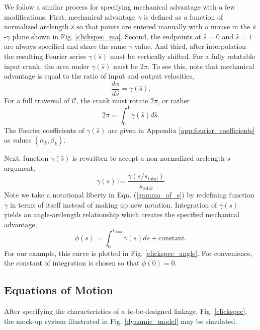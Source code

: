 \documentclass[journal]{IEEEtran}
\begin{document}
We follow a similar process for specifying mechanical advantage with a few modifications.
First, mechanical advantage $\gamma$ is defined as a function of normalized arclength $\hat{s}$ so that points are entered manually with a mouse in the $\hat{s}$-$\gamma$ plane shown in Fig. \ref{clickspec_ma}.
Second, the endpoints at $\hat{s}\!=\!0$ and $\hat{s}\!=\!1$ are always specified and share the same $\gamma$ value.
And third, after interpolation the resulting Fourier series $\gamma(\hat{s})$ must be vertically shifted.
For a fully rotatable input crank, the area under $\gamma(\hat{s})$ must be $2\pi$.
To see this, note that mechanical advantage is equal to the ratio of input and output velocities,
\begin{equation}
\frac{d\phi}{d\hat{s}} = \gamma(\hat{s}).
\end{equation}
For a full traversal of $\mathcal{C}$, the crank must rotate $2\pi$, or rather
\begin{equation}
2\pi = \int_{0}^{1} \gamma(\hat{s}) d\hat{s}.
\end{equation}
The Fourier coefficients of $\gamma(\hat{s})$ are given in Appendix \ref{app:fourier_coefficients} as values $(\alpha_k, \beta_k)$.

Next, function $\gamma(\hat{s})$ is rewritten to accept a non-normalized arclength $s$ argument,
\begin{equation}
\gamma(s) := \frac{\gamma(s/s_\text{total})}{s_\text{total}}
\label{gamma_of_s}
\end{equation}
Note we take a notational liberty in Eqn. (\ref{gamma_of_s}) by redefining function $\gamma$ in terms of itself instead of making up new notation.
Integration of $\gamma(s)$ yields an angle-arclength relationship which creates the specified mechanical advantage,
\begin{equation}
\phi(s) = \int_{0}^{s_\text{total}} \gamma(s)ds + \text{constant}.
\end{equation}
For our example, this curve is plotted in Fig. \ref{clickspec_angle}.  For convenience, the constant of integration is chosen so that $\phi(0) = 0$.

\subsection{Equations of Motion}
\label{sec:eq_of_mot}

After specifying the characteristics of a to-be-designed linkage, Fig. \ref{clickspec}, the mock-up system illustrated in Fig. \ref{dynamic_model} may be simulated.
\end{document}
